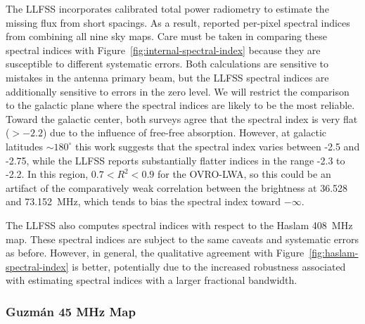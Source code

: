 \begin{bibunit}
The LLFSS incorporates calibrated total power radiometry to estimate the missing flux from short
spacings. As a result, \citet{2017MNRAS.469.4537D} reported per-pixel spectral indices from combining
all nine sky maps. Care must be taken in comparing these spectral indices with
Figure~\ref{fig:internal-spectral-index} because they are susceptible to different systematic
errors. Both calculations are sensitive to mistakes in the antenna primary beam, but the LLFSS
spectral indices are additionally sensitive to errors in the zero level. We will restrict the
comparison to the galactic plane where the spectral indices are likely to be the most reliable.
Toward the galactic center, both surveys agree that the spectral index is very flat ($>-2.2$) due to
the influence of free-free absorption.  However, at galactic latitudes $\sim 180^\circ$ this work
suggests that the spectral index varies between -2.5 and -2.75, while the LLFSS reports
substantially flatter indices in the range -2.3 to -2.2. In this region, $0.7 < R^2 < 0.9$ for the
OVRO-LWA, so this could be an artifact of the comparatively weak correlation between the brightness
at 36.528 and 73.152~MHz, which tends to bias the spectral index toward $-\infty$.

The LLFSS also computes spectral indices with respect to the Haslam 408~MHz map. These spectral
indices are subject to the same caveats and systematic errors as before. However, in general, the
qualitative agreement with Figure~\ref{fig:haslam-spectral-index} is better, potentially due to the
increased robustness associated with estimating spectral indices with a larger fractional bandwidth.

\subsubsection{Guzm\'{a}n 45 MHz Map}


\end{bibunit}
